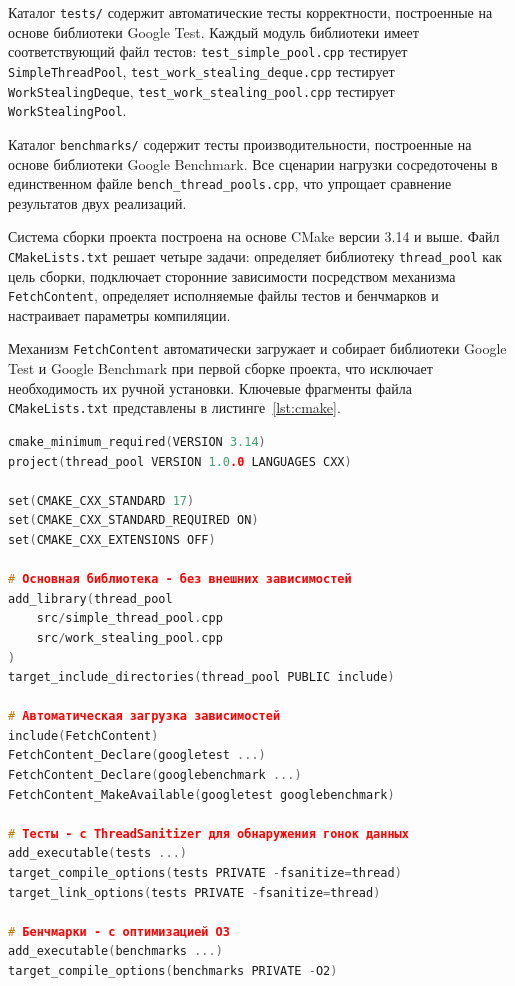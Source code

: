 Каталог \texttt{tests/} содержит автоматические тесты
корректности, построенные на основе библиотеки Google Test.
Каждый модуль библиотеки имеет соответствующий файл тестов:
\texttt{test\_simple\_pool.cpp} тестирует \texttt{SimpleThreadPool},
\texttt{test\_work\_stealing\_deque.cpp} тестирует
\texttt{WorkStealingDeque}, \texttt{test\_work\_stealing\_pool.cpp}
тестирует \texttt{WorkStealingPool}.

Каталог \texttt{benchmarks/} содержит тесты производительности,
построенные на основе библиотеки Google Benchmark. Все сценарии
нагрузки сосредоточены в единственном файле
\texttt{bench\_thread\_pools.cpp}, что упрощает сравнение
результатов двух реализаций.

Система сборки проекта построена на основе CMake версии
3.14 и выше. Файл \texttt{CMakeLists.txt} решает четыре
задачи: определяет библиотеку \texttt{thread\_pool} как
цель сборки, подключает сторонние зависимости посредством
механизма \texttt{FetchContent}, определяет исполняемые
файлы тестов и бенчмарков и настраивает параметры компиляции.

Механизм \texttt{FetchContent} автоматически загружает
и собирает библиотеки Google Test и Google Benchmark
при первой сборке проекта, что исключает необходимость
их ручной установки. Ключевые фрагменты файла
\texttt{CMakeLists.txt} представлены в листинге~\ref{lst:cmake}.

\begin{lstlisting}[language=C++,
                   caption={Ключевые фрагменты CMakeLists.txt},
                   label={lst:cmake}]
cmake_minimum_required(VERSION 3.14)
project(thread_pool VERSION 1.0.0 LANGUAGES CXX)

set(CMAKE_CXX_STANDARD 17)
set(CMAKE_CXX_STANDARD_REQUIRED ON)
set(CMAKE_CXX_EXTENSIONS OFF)

# Основная библиотека - без внешних зависимостей
add_library(thread_pool
    src/simple_thread_pool.cpp
    src/work_stealing_pool.cpp
)
target_include_directories(thread_pool PUBLIC include)

# Автоматическая загрузка зависимостей
include(FetchContent)
FetchContent_Declare(googletest ...)
FetchContent_Declare(googlebenchmark ...)
FetchContent_MakeAvailable(googletest googlebenchmark)

# Тесты - с ThreadSanitizer для обнаружения гонок данных
add_executable(tests ...)
target_compile_options(tests PRIVATE -fsanitize=thread)
target_link_options(tests PRIVATE -fsanitize=thread)

# Бенчмарки - с оптимизацией O3
add_executable(benchmarks ...)
target_compile_options(benchmarks PRIVATE -O2)
\end{lstlisting}

